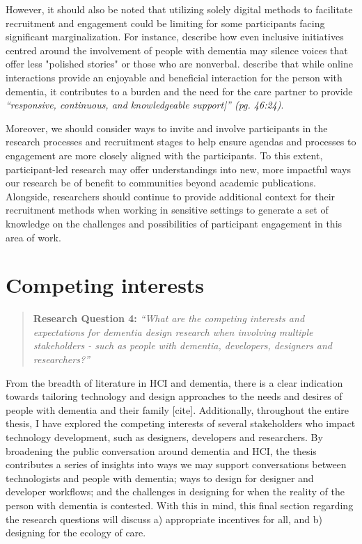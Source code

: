 However, it should also be noted that utilizing solely digital methods to facilitate recruitment and engagement could be limiting for some participants facing significant marginalization. For instance, \citep{lazar_safe_2019} describe how even inclusive initiatives centred around the involvement of people with dementia may silence voices that offer less "polished stories" or those who are nonverbal. \cite{dai2020making} describe that while online interactions provide an enjoyable and beneficial interaction for the person with dementia, it contributes to a burden and the need for the care partner to provide \textit{“responsive, continuous, and knowledgeable support|” (pg. 46:24)\citep{hwang2020exploring}}. 

Moreover, we should consider ways to invite and involve participants in the research processes and recruitment stages to help ensure agendas and processes to engagement are more closely aligned with the participants. To this extent, participant-led research may offer understandings into new, more impactful ways our research be of benefit to communities beyond academic publications. Alongside, researchers should continue to provide additional context for their recruitment methods when working in sensitive settings to generate a set of knowledge on the challenges and possibilities of participant engagement in this area of work.

\section{Competing interests}
\label{Discussion:RQ4}
\begin{quote}
\textbf{    Research Question 4:
}    
\textit{    “What are the competing interests and expectations for dementia design research when involving multiple stakeholders - such as people with dementia, developers, designers and researchers?”}
\end{quote}
From the breadth of literature in HCI and dementia, there is a clear indication towards tailoring technology and design approaches to the needs and desires of people with dementia and their family [cite]. Additionally, throughout the entire thesis, I have explored the competing interests of several stakeholders who impact technology development, such as designers, developers and researchers. By broadening the public conversation around dementia and HCI, the thesis contributes a series of insights into ways we may support conversations between technologists and people with dementia; ways to design for designer and developer workflows; and the challenges in designing for when the reality of the person with dementia is contested. With this in mind, this final section regarding the research questions will discuss a) appropriate incentives for all, and  b) designing for the ecology of care. 

